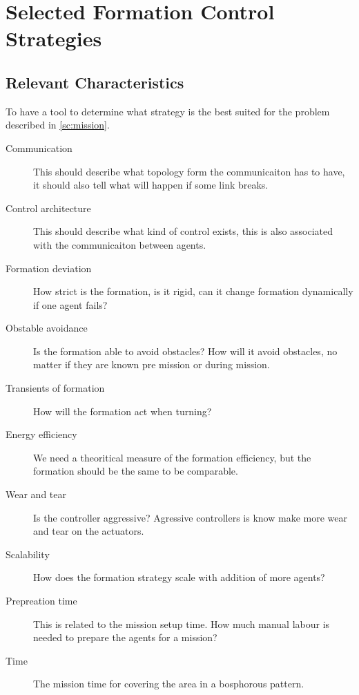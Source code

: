 \chapter{Selected Formation Control Strategies}
\label{ch:selformctrl}


\section{Relevant Characteristics}
To have a tool to determine what strategy is the best suited for the problem described in \vref{sc:mission}.

\begin{description}
\item[Communication] This should describe what topology form the communicaiton has to have, it should also tell what will happen if some link breaks.
\item[Control architecture] This should describe what kind of control exists, this is also associated with the communicaiton between agents.
\item[Formation deviation] How strict is the formation, is it rigid, can it change formation dynamically if one agent fails?
\item[Obstable avoidance] Is the formation able to avoid obstacles? How will it avoid obstacles, no matter if they are known pre mission or during mission.
\item[Transients of formation] How will the formation act when turning?
\item[Energy efficiency] We need a theoritical measure of the formation efficiency, but the formation should be the same to be comparable.
\item[Wear and tear] Is the controller aggressive? Agressive controllers is know make more wear and tear on the actuators.
\item[Scalability] How does the formation strategy scale with addition of more agents?
\item[Prepreation time] This is related to the mission setup time. How much manual labour is needed to prepare the agents for a mission?
\item[Time] The mission time for covering the area in a bosphorous pattern.
\end{description}
